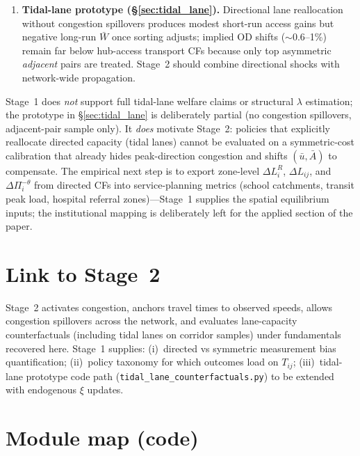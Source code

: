 \documentclass[12pt]{article}
\newcommand{\Wbar}{\bar W}
\begin{document}
\begin{enumerate}[leftmargin=2em,itemsep=0.35em]
  \item \textbf{Tidal-lane prototype (\S\ref{sec:tidal_lane}).}
        Directional lane reallocation without congestion spillovers produces modest
        short-run access gains but negative long-run $\Wbar$ once sorting adjusts;
        implied OD shifts ($\sim$0.6--1\%) remain far below hub-access transport CFs
        because only top asymmetric \emph{adjacent} pairs are treated.
        Stage~2 should combine directional shocks with network-wide propagation.
\end{enumerate}

Stage~1 does \emph{not} support full tidal-lane welfare claims or structural $\lambda$
estimation; the prototype in \S\ref{sec:tidal_lane} is deliberately partial (no
congestion spillovers, adjacent-pair sample only).
It \emph{does} motivate Stage~2: policies that explicitly reallocate directed capacity
(tidal lanes) cannot be evaluated on a symmetric-cost calibration that already hides
peak-direction congestion and shifts $(\bar u,\bar A)$ to compensate.
The empirical next step is to export zone-level $\Delta L_i^R$, $\Delta L_{ij}$, and
$\Delta\Pi_i^{-\theta}$ from directed CFs into service-planning metrics (school
catchments, transit peak load, hospital referral zones)---Stage~1 supplies the spatial
equilibrium inputs; the institutional mapping is deliberately left for the applied
section of the paper.

\section{Link to Stage~2}\label{sec:stage2}

Stage~2 activates congestion, anchors travel times to observed speeds, allows
congestion spillovers across the network, and evaluates lane-capacity counterfactuals
(including tidal lanes on corridor samples) under fundamentals recovered here.
Stage~1 supplies: (i)~directed vs symmetric measurement bias quantification;
(ii)~policy taxonomy for which outcomes load on $T_{ij}$; (iii)~tidal-lane prototype
code path (\texttt{tidal\_lane\_counterfactuals.py}) to be extended with endogenous
$\xi$ updates.

\appendix
\section{Module map (code)}\label{app:code}
\end{document}
